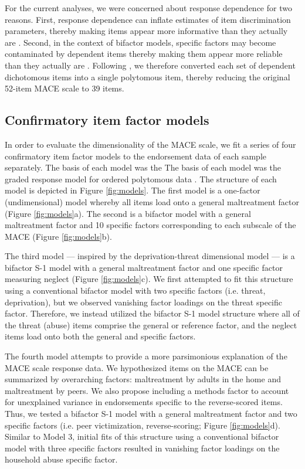 \documentclass[letterpaper,man,natbib]{apa6}  %
\begin{document}
For the current analyses, we were concerned about response dependence for two reasons. First, response dependence can inflate estimates of item discrimination parameters, thereby making items appear more informative than they actually are \citep{marais2008formalizing}. Second, in the context of bifactor models, specific factors may become contaminated by dependent items thereby making them appear more reliable than they actually are \citep{reise2013applying}. Following \cite{marais2008formalizing}, we therefore converted each set of dependent dichotomous items into a single polytomous item, thereby reducing the original 52-item MACE scale to 39 items.

\subsection{Confirmatory item factor models}

In order to evaluate the dimensionality of the MACE scale, we fit a series of four confirmatory item factor models to the endorsement data of each sample separately. The basis of each model was the The basis of each model was the graded response model for ordered polytomous data \citep{samejima1997graded}. The structure of each model is depicted in Figure \ref{fig:models}. The first model is a one-factor (undimensional) model whereby all items load onto a general maltreatment factor (Figure \ref{fig:models}a). The second is a bifactor model with a general maltreatment factor and 10 specific factors corresponding to each subscale of the MACE (Figure \ref{fig:models}b). 

The third model --- inspired by the deprivation-threat dimensional model \citep{mclaughlin2014childhood} --- is a bifactor S-1 model with a general maltreatment factor and one specific factor measuring neglect (Figure \ref{fig:models}c). We first attempted to fit this structure using a conventional bifactor model with two specific factors (i.e. threat, deprivation), but we observed vanishing factor loadings on the threat specific factor. Therefore, we instead utilized the bifactor S-1 model structure \citep{eid2017anomalous} where all of the threat (abuse) items comprise the general or reference factor, and the neglect items load onto both the general and specific factors. 

The fourth model attempts to provide a more parsimonious explanation of the MACE scale response data. We hypothesized items on the MACE can be summarized by overarching factors: maltreatment by adults in the home and maltreatment by peers. We also propose including a methods factor to account for unexplained variance in endorsements specific to the reverse-scored items. Thus, we tested a bifactor S-1 model with a general maltreatment factor and two specific factors (i.e. peer victimization, reverse-scoring; Figure \ref{fig:models}d). Similar to Model 3, initial fits of this structure using a conventional bifactor model with three specific factors resulted in vanishing factor loadings on the household abuse specific factor.
\end{document}
